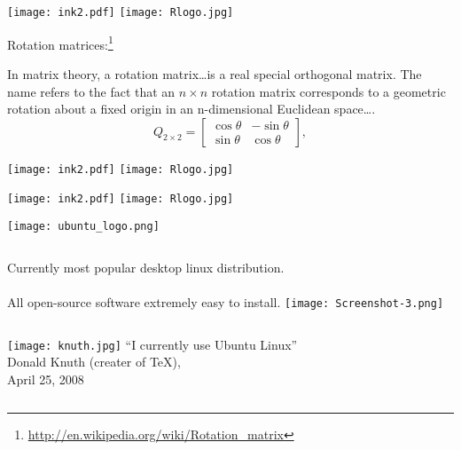 \documentclass[12pt,mathserif]{beamer}
\newcommand{\bl}[1]{\color{titleblue}{#1 }\color{black}}
\begin{document}
\begin{frame}
{\texttt{[image: ink2.pdf]} \textrightarrow \texttt{[image: Rlogo.jpg]} \hfill \hfill \hfill \bl{trace bitmap, export}}

{\large Rotation matrices:}\footnote{\url{http://en.wikipedia.org/wiki/Rotation_matrix}}

In matrix theory, a rotation matrix\ldots is a real special orthogonal matrix. The name refers to the fact that an $n \times n$ rotation matrix corresponds to a geometric rotation about a fixed origin in an n-dimensional Euclidean space\ldots.
\[Q_{2 \times 2} = \begin{bmatrix}\cos \theta & -\sin \theta \\ \sin \theta & \cos \theta\end{bmatrix},\]
\end{frame}

\begin{frame}
{\texttt{[image: ink2.pdf]} \textrightarrow \texttt{[image: Rlogo.jpg]} \hfill \hfill \hfill \bl{trace bitmap, export}}
\begin{center}
\end{center}
\end{frame}


\begin{frame}
{\texttt{[image: ink2.pdf]} \textrightarrow \texttt{[image: Rlogo.jpg]} \hfill \hfill \hfill \bl{trace bitmap, export}}
\begin{center}

\end{center}
\end{frame}


\begin{frame}
{\texttt{[image: ubuntu\_logo.png]}}
\begin{columns}
{Currently most popular desktop linux distribution. \\ \ \\ All open-source software extremely easy to install.}
\texttt{[image: Screenshot-3.png]}
\end{columns}
\begin{columns}
\texttt{[image: knuth.jpg]}
``I currently use Ubuntu Linux''\\ Donald Knuth (creater of \TeX), \\ April 25, 2008
\end{columns}
\end{frame}
\end{document}
